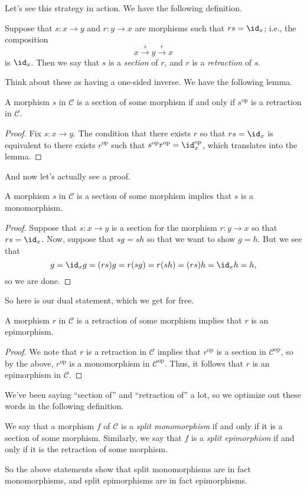 Let's see this strategy in action. We have the following definition.
\begin{definition}
	Suppose that $s:x\to y$ and $r:y\to x$ are morphisms such that $rs=\id_x$; i.e., the composition
	\[x\stackrel s\to y\stackrel r\to x\]
	is $\id_x$. Then we say that $s$ is a \textit{section} of $r$, and $r$ is a \textit{retraction} of $s$.
\end{definition}
Think about these as having a one-sided inverse. We have the following lemma.
\begin{lemma}
	A morphism $s$ in $\mathcal C$ is a section of some morphism if and only if $s^\mathrm{op}$ is a retraction in $\mathcal C$.
\end{lemma}
\begin{proof}
	Fix $s:x\to y$. The condition that there exists $r$ so that $rs=\id_x$ is equivalent to there exists $r^\mathrm{op}$ such that $s^\mathrm{op}r^\mathrm{op}=\id_x^\mathrm{op}$, which translates into the lemma.
\end{proof}
And now let's actually see a proof.
\begin{proposition}
	A morphism $s$ in $\mathcal C$ is a section of some morphism implies that $s$ is a monomorphism.
\end{proposition}
\begin{proof}
	Suppose that $s:x\to y$ is a section for the morphism $r:y\to x$ so that $rs=\id_x$. Now, suppose that $sg=sh$ so that we want to show $g=h$. But we see that
	\[g=\id_xg=(rs)g=r(sg)=r(sh)=(rs)h=\id_xh=h,\]
	so we are done.
\end{proof}
So here is our dual statement, which we get for free.
\begin{proposition}
	A morphism $r$ in $\mathcal C$ is a retraction of some morphism implies that $r$ is an epimorphism.
\end{proposition}
\begin{proof}
	We note that $r$ is a retraction in $\mathcal C$ implies that $r^\mathrm{op}$ is a section in $\mathcal C^\mathrm{op}$, so by the above, $r^\mathrm{op}$ is a monomorphism in $\mathcal C^\mathrm{op}$. Thus, it follows that $r$ is an epimorphism in $\mathcal C$.
\end{proof}
We've been saying ``section of'' and ``retraction of'' a lot, so we optimize out these words in the following definition.
\begin{definition}
	We say that a morphism $f$ of $\mathcal C$ is a \textit{split monomorphism} if and only if it is a section of some morphism. Similarly, we say that $f$ is a \textit{split epimorphism} if and only if it is the retraction of some morphism.
\end{definition}
So the above statements show that split monomorphisms are in fact monomorphisms, and split epimorphisms are in fact epimorphisms.

